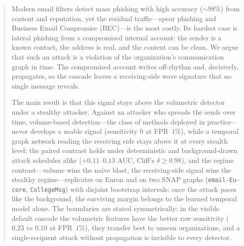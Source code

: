 \documentclass[a4paper,fleqn]{cas-sc}
\begin{document}
\begin{abstract}
Modern email filters detect mass phishing with high accuracy ($\sim$98\%) from content and reputation, yet
the residual traffic---spear phishing and Business Email Compromise (BEC)---is the most costly. Its hardest case
is lateral phishing from a compromised internal account: the sender is a known contact, the address is real,
and the content can be clean. We argue that such an attack is a violation of the organization's communication
graph in time. The compromised account writes off-rhythm and, decisively, propagates, so the cascade leaves a
receiving-side wave signature that no single message reveals.

The main result is that this signal stays above the volumetric detector under a stealthy attacker. Against an attacker who spreads the
sends over time, volume-based detection---the class of methods deployed in practice---never develops a
usable signal (sensitivity $0$ at FPR~$1\%$), while a temporal graph
network reading the receiving side stays above it at every stealth level; the paired contrast holds under
deterministic and background-drawn attack schedules alike ($+0.11$--$0.13$ AUC, Cliff's
$\delta\ge0.98$), and the regime contrast---volume wins the naive blast, the receiving-side signal wins
the stealthy regime---replicates on Enron and on two SNAP graphs
(\texttt{email-Eu-core}, \texttt{CollegeMsg}) with disjoint bootstrap intervals: once the attack paces
like the background, the surviving margin belongs to the learned temporal model alone. The boundaries are
stated symmetrically: in the visible default cascade the volumetric features have the better raw
sensitivity ($0.23$ vs $0.10$ at FPR~$1\%$), they transfer best to unseen organizations, and a
single-recipient attack without propagation is invisible to every detector.


\end{abstract}
\end{document}
